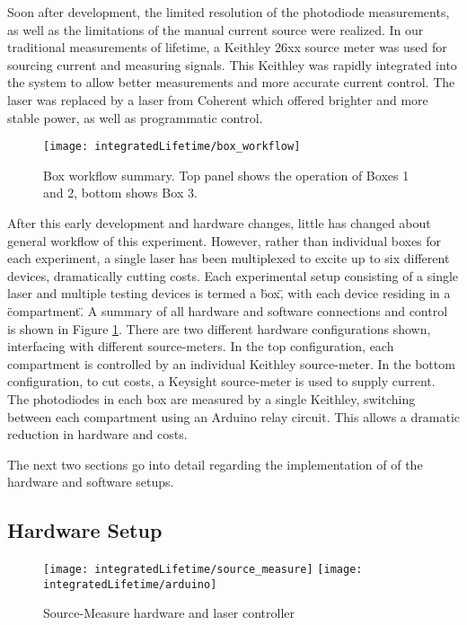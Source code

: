 \documentclass[../thesis.tex]{subfiles}
\begin{document}
Soon after development, the limited resolution of the photodiode measurements, as well as the limitations of the manual current source were realized.
In our traditional measurements of lifetime, a Keithley 26xx source meter was used for sourcing current and measuring signals.  
This Keithley was rapidly integrated into the system to allow better measurements and more accurate current control.
The laser was replaced by a laser from Coherent which offered brighter and more stable power, as well as programmatic control.  

\begin{figure}[ht]
\centering
\texttt{[image: integratedLifetime/box\_workflow]}
\caption{Box workflow summary.  Top panel shows the operation of Boxes 1 and 2, bottom shows Box 3.}
\label{fig:box_workflow}
\end{figure}

After this early development and hardware changes, little has changed about general workflow of this experiment.
However, rather than individual boxes for each experiment, a single laser has been multiplexed to excite up to six different devices, dramatically cutting costs.
Each experimental setup consisting of a single laser and multiple testing devices is termed a \"box\", with each device residing in a \"compartment\".
A summary of all hardware and software connections and control is shown in Figure \ref{fig:box_workflow}.
There are two different hardware configurations shown, interfacing with different source-meters.
In the top configuration, each compartment is controlled by an individual Keithley source-meter.
In the bottom configuration, to cut costs, a Keysight source-meter is used to supply current.  
The photodiodes in each box are measured by a single Keithley, switching between each compartment using an Arduino relay circuit.
This allows a dramatic reduction in hardware and costs.

The next two sections go into detail regarding the implementation of of the hardware and software setups.

\subsection{Hardware Setup}

\begin{figure}[ht]
    \begin{minipage}{\linewidth}
    \centering
    \texttt{[image: integratedLifetime/source\_measure]}
    \texttt{[image: integratedLifetime/arduino]}
    \caption{Source-Measure hardware and laser controller}
    \label{fig:source_measure}
    \end{minipage}
\end{figure}
\end{document}
